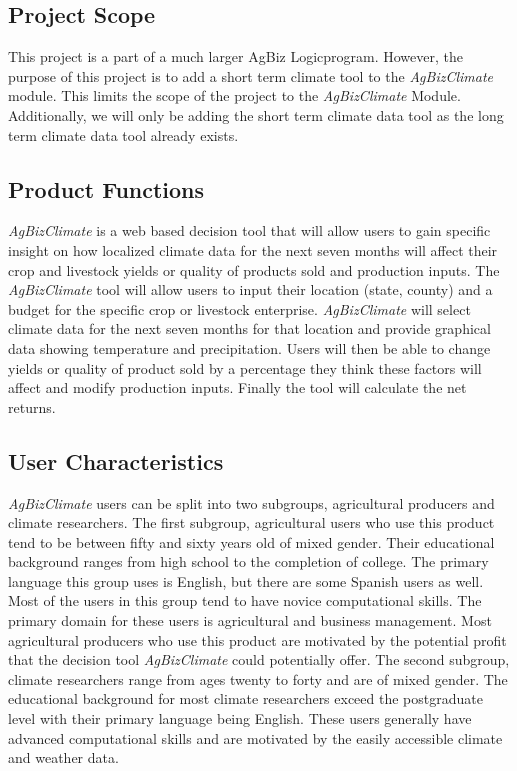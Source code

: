 \documentclass[onecolumn, draftclsnofoot,10pt, compsoc]{article}
\begin{document}
    \subsection{Project Scope}
		This project is a part of a much larger AgBiz Logic\texttrademark program. However, the purpose of this project is to add a short term climate tool to the \textit{AgBizClimate} module. This limits the scope of the project to the \textit{AgBizClimate} Module. Additionally, we will only be adding the short term climate data tool as the long term climate data tool already exists.\\


			
	\subsection {Product Functions}
			\textit{AgBizClimate} is a web based decision tool that will allow users to gain specific insight on how localized climate data for the next seven months will affect their crop and livestock yields or quality of products sold and production inputs. The \textit{AgBizClimate} tool will allow users to input their location (state, county) and a budget for the specific crop or livestock enterprise. \textit{AgBizClimate} will select climate data for the next seven months for that location and provide graphical data showing temperature and precipitation. Users will then be able to change yields or quality of product sold by a percentage they think these factors will affect and modify production inputs. Finally the tool will calculate the net returns.\\

	\subsection{User Characteristics}
		\textit{AgBizClimate} users can be split into two subgroups, agricultural producers and climate researchers. The first subgroup, agricultural users who use this product tend to be between fifty and sixty years old of mixed gender. Their educational background ranges from high school to the completion of college. The primary language this group uses is English, but there are some Spanish users as well. Most of the users in this group tend to have novice computational skills. The primary domain for these users is agricultural and business management. Most agricultural producers who use this product are motivated by the potential profit that the decision tool \textit{AgBizClimate} could potentially offer. The second subgroup, climate researchers range from ages twenty to forty and are of mixed gender. The educational background for most climate researchers  exceed the postgraduate level with their primary language being English. These users generally have advanced computational skills and are motivated by the easily accessible climate and weather data.\\
\end{document}
